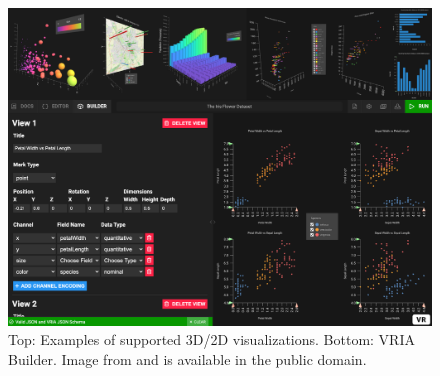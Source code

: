 \documentclass{vgtc}                          %
\begin{document}
\begin{figure}[tb]
	\centering
	\includegraphics[width=\columnwidth]{vria_toolkit}
    \caption{Top: Examples of supported 3D/2D visualizations. Bottom: VRIA Builder.
    Image from \cite{vria:repo} and is available in the public domain.}
	\label{fig:vria_toolkit}
\end{figure}

\medskip
\end{document}
